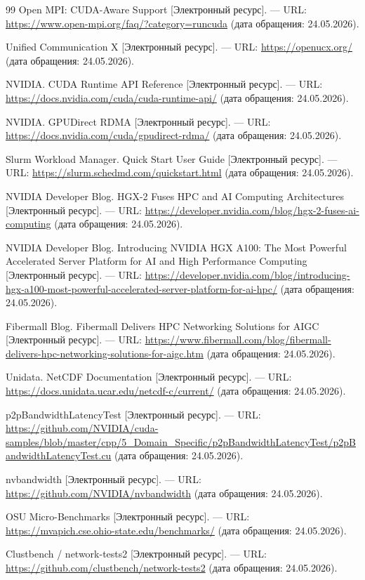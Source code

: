 \documentclass[a4paper,14pt]{extarticle}
\begin{document}
\begin{thebibliography}{99}
	Open MPI: CUDA-Aware Support [Электронный ресурс]. --- URL: \url{https://www.open-mpi.org/faq/?category=runcuda} (дата обращения: 24.05.2026).

	Unified Communication X [Электронный ресурс]. --- URL: \url{https://openucx.org/} (дата обращения: 24.05.2026).

	NVIDIA. CUDA Runtime API Reference [Электронный ресурс]. --- URL: \url{https://docs.nvidia.com/cuda/cuda-runtime-api/} (дата обращения: 24.05.2026).

	NVIDIA. GPUDirect RDMA [Электронный ресурс]. --- URL: \url{https://docs.nvidia.com/cuda/gpudirect-rdma/} (дата обращения: 24.05.2026).

	Slurm Workload Manager. Quick Start User Guide [Электронный ресурс]. --- URL: \url{https://slurm.schedmd.com/quickstart.html} (дата обращения: 24.05.2026).

	NVIDIA Developer Blog. HGX-2 Fuses HPC and AI Computing Architectures [Электронный ресурс]. --- URL: \url{https://developer.nvidia.com/blog/hgx-2-fuses-ai-computing} (дата обращения: 24.05.2026).

	NVIDIA Developer Blog. Introducing NVIDIA HGX A100: The Most Powerful Accelerated Server Platform for AI and High Performance Computing [Электронный ресурс]. --- URL: \url{https://developer.nvidia.com/blog/introducing-hgx-a100-most-powerful-accelerated-server-platform-for-ai-hpc/} (дата обращения: 24.05.2026).

	Fibermall Blog. Fibermall Delivers HPC Networking Solutions for AIGC [Электронный ресурс]. --- URL: \url{https://www.fibermall.com/blog/fibermall-delivers-hpc-networking-solutions-for-aigc.htm} (дата обращения: 24.05.2026).

	Unidata. NetCDF Documentation [Электронный ресурс]. --- URL: \url{https://docs.unidata.ucar.edu/netcdf-c/current/} (дата обращения: 24.05.2026).

	p2pBandwidthLatencyTest [Электронный ресурс]. --- URL: \url{https://github.com/NVIDIA/cuda-samples/blob/master/cpp/5_Domain_Specific/p2pBandwidthLatencyTest/p2pBandwidthLatencyTest.cu} (дата обращения: 24.05.2026).

	nvbandwidth [Электронный ресурс]. --- URL: \url{https://github.com/NVIDIA/nvbandwidth} (дата обращения: 24.05.2026).

	OSU Micro-Benchmarks [Электронный ресурс]. --- URL: \url{https://mvapich.cse.ohio-state.edu/benchmarks/} (дата обращения: 24.05.2026).

	Clustbench / network-tests2 [Электронный ресурс]. --- URL: \url{https://github.com/clustbench/network-tests2} (дата обращения: 24.05.2026).

\end{thebibliography}
\end{document}
